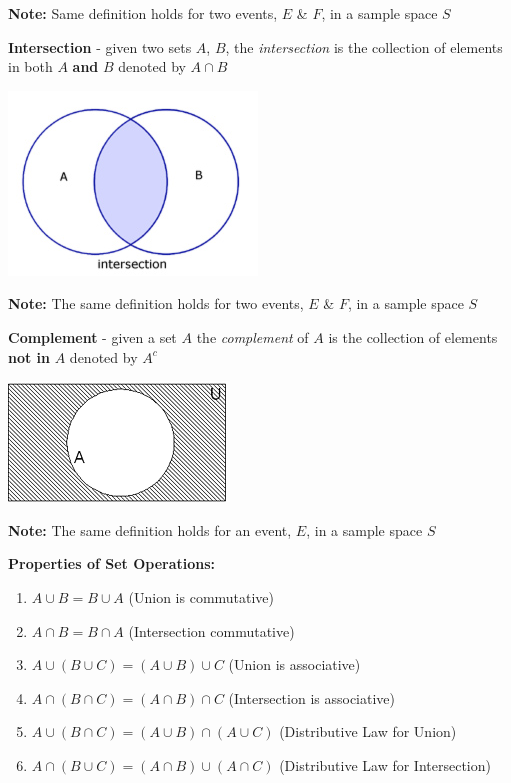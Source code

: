 \documentclass[12pt]{article}
\begin{document}
\textbf{Note:} Same definition holds for two events, $E$ \& $F$, in a sample space $S$

\textbf{Intersection} - given two sets $A$, $B$, the \textit{intersection} is the collection of elements in both $A$ \textbf{and} $B$ denoted by $A \cap B$
\newline

\centerline{\includegraphics[scale=.7]{Intersection.jpg}}

\textbf{Note:} The same definition holds for two events, $E$ \& $F$, in a sample space $S$

\vspace{.5cm}

\textbf{Complement} - given a set $A$ the \textit{complement} of $A$  is the collection of elements \textbf{not in} $A$ denoted by $A^{c}$
\newline

\centerline{\includegraphics{Complement.png}}

\textbf{Note:} The same definition holds for an event, $E$, in a sample space $S$

\vspace{1.5cm} 

\textbf{Properties of Set Operations:}

\begin{enumerate}
\item $A \cup B = B \cup A$ \hspace {4cm} (Union is commutative)
\item $A \cap B = B \cap A$ \hspace {4cm} (Intersection commutative)
\item $A \cup (B \cup C) = (A \cup B) \cup C$ \hspace {1.8cm} (Union is associative)
\item $A \cap (B \cap C) = (A \cap B) \cap C$ \hspace {1.8cm} (Intersection is associative)
\item $A \cup (B \cap C) = (A \cup B) \cap (A \cup C)$ \hspace {.65cm} (Distributive Law for Union)
\item $A \cap (B \cup C) = (A \cap B) \cup (A \cap C)$ \hspace {1cm} (Distributive Law for Intersection)
\end{enumerate}
\end{document}
